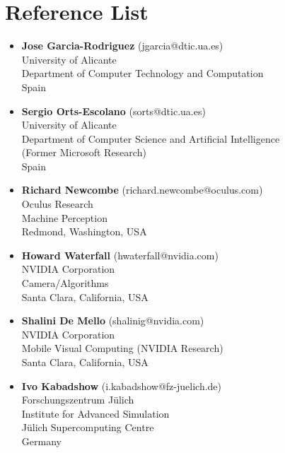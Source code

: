 \documentclass[8pt]{article}
\begin{document}
\section*{Reference List}
\begin{itemize}
	\item {\textbf{Jose Garcia-Rodriguez} (jgarcia@dtic.ua.es)\\
    University of Alicante\\
    Department of Computer Technology and Computation\\
    Spain\\}
	\item {\textbf{Sergio Orts-Escolano} (sorts@dtic.ua.es)\\
University of Alicante\\
		Department of Computer Science and Artificial Intelligence\\
		(Former Microsoft Research)\\
		Spain\\}

  \item {\textbf{Richard Newcombe} (richard.newcombe@oculus.com)\\
  Oculus Research\\
  Machine Perception\\
    Redmond, Washington, USA\\}

  \item {\textbf{Howard Waterfall} (hwaterfall@nvidia.com)\\
	NVIDIA Corporation\\
	Camera/Algorithms\\
	Santa Clara, California, USA\\}

  \item{\textbf{Shalini De Mello} (shalinig@nvidia.com)\\
	NVIDIA Corporation\\
	Mobile Visual Computing (NVIDIA Research)\\
	Santa Clara, California, USA\\}

  \item {\textbf{Ivo Kabadshow} (i.kabadshow@fz-juelich.de)\\
    Forschungszentrum Jülich\\
    Institute for Advanced Simulation\\
    Jülich Supercomputing Centre\\
    Germany\\}


\end{itemize}
 
\end{document}
